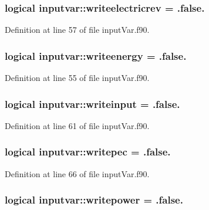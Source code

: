 \hypertarget{classinputvar_afd3b4bc26c396eaba06cecc08717acf1}{
\subsubsection[{writeelectricrev}]{\setlength{\rightskip}{0pt plus 5cm}logical inputvar\-::writeelectricrev = .false.}}\label{classinputvar_afd3b4bc26c396eaba06cecc08717acf1}


Definition at line 57 of file input\-Var.\-f90.

\hypertarget{classinputvar_ae3e52c17a47fe8dd3e860abff881cfb0}{
\subsubsection[{writeenergy}]{\setlength{\rightskip}{0pt plus 5cm}logical inputvar\-::writeenergy = .false.}}\label{classinputvar_ae3e52c17a47fe8dd3e860abff881cfb0}


Definition at line 55 of file input\-Var.\-f90.

\hypertarget{classinputvar_a97c8b194b0db24c1c790d57bcc7b0f70}{
\subsubsection[{writeinput}]{\setlength{\rightskip}{0pt plus 5cm}logical inputvar\-::writeinput = .false.}}\label{classinputvar_a97c8b194b0db24c1c790d57bcc7b0f70}


Definition at line 61 of file input\-Var.\-f90.

\hypertarget{classinputvar_a81f46f9ef3ef3bdb78c79994791f3472}{
\subsubsection[{writepec}]{\setlength{\rightskip}{0pt plus 5cm}logical inputvar\-::writepec = .false.}}\label{classinputvar_a81f46f9ef3ef3bdb78c79994791f3472}


Definition at line 66 of file input\-Var.\-f90.

\hypertarget{classinputvar_ae3e0dfd2907bb36d0f62715b24f63536}{
\subsubsection[{writepower}]{\setlength{\rightskip}{0pt plus 5cm}logical inputvar\-::writepower = .false.}}\label{classinputvar_ae3e0dfd2907bb36d0f62715b24f63536}


